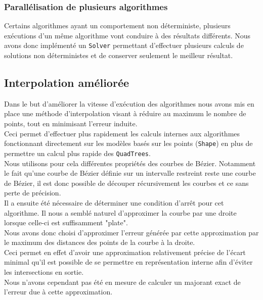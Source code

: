 \subsubsection{Parallélisation de plusieurs algorithmes} Certains algorithmes ayant un comportement non déterministe, plusieurs exécutions d'un même algorithme vont conduire à des résultats différents.
Nous avons donc implémenté un \texttt{Solver} permettant d'effectuer plusieurs calculs de solutions non déterministes et de conserver seulement le meilleur résultat.


\subsection{Interpolation améliorée}

Dans le but d'améliorer la vitesse d'exécution des algorithmes nous avons mis en place une méthode d'interpolation visant à réduire au maximum le nombre de points, tout en minimisant l'erreur induite.\\ 

Ceci permet d'effectuer plus rapidement les calculs internes aux algorithmes fonctionnant directement sur les modèles basés sur les points (\texttt{Shape}) en plus de permettre un calcul plus rapide des \texttt{QuadTrees}.\\

Nous utilisons pour cela différentes propriétés des courbes de Bézier. Notamment le fait qu'une courbe de Bézier définie sur un intervalle restreint reste une courbe de Bézier, il est donc possible de découper récursivement les courbes et ce sans perte de précision.\\

Il a ensuite été nécessaire de déterminer une condition d'arrêt pour cet algorithme. Il nous a semblé naturel d'approximer la courbe par une droite lorsque celle-ci est suffisamment "plate".\\ Nous avons donc choisi d'approximer l'erreur générée par cette approximation par le maximum des distances des points de la courbe à la droite. \\%

Ceci permet en effet d'avoir une approximation relativement précise de l'écart minimal qu'il est possible de se permettre en représentation interne afin d'éviter les intersections en sortie. \\%
Nous n'avons cependant pas été en mesure de calculer un majorant exact de l'erreur due à cette approximation. \\

